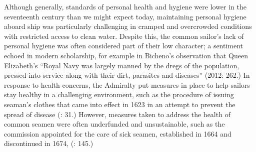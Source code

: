 Although generally, standards of personal health and hygiene were lower in the seventeenth century than we might expect today, maintaining personal hygiene aboard ship was particularly challenging in cramped and overcrowded conditions with restricted access to clean water. Despite this, the common sailor’s lack of personal hygiene was often considered part of their low character; a sentiment echoed in modern scholarship, for example in Bicheno’s observation that Queen Elizabeth’s “Royal Navy was largely manned by the dregs of the population, pressed into service along with their dirt, parasites and diseases” (2012: 262.) In response to health concerns, the Admiralty put measures in place to help sailors stay healthy in a challenging environment, such as the procedure of issuing seaman’s clothes that came into effect in 1623 in an attempt to prevent the spread of disease (\citealt{Brown2011}: 31.) However, measures taken to address the health of common seamen were often underfunded and unsustainable, such as the commission appointed for the care of sick seamen, established in 1664 and discontinued in 1674, (\citealt{Lincoln2015}: 145.)

